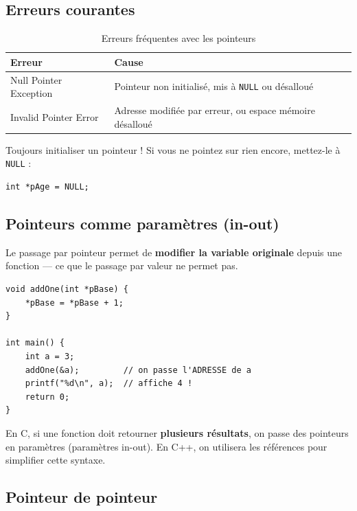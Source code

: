 \documentclass[12pt,a4paper]{article}
\begin{document}
\subsection{Erreurs courantes}

\begin{table}[h!]
\centering
\caption{Erreurs fréquentes avec les pointeurs}
\begin{tabular}{lp{8cm}}
\toprule
\textbf{Erreur} & \textbf{Cause} \\
\midrule
Null Pointer Exception & Pointeur non initialisé, mis à \texttt{NULL} ou désalloué \\
Invalid Pointer Error  & Adresse modifiée par erreur, ou espace mémoire désalloué \\
\bottomrule
\end{tabular}
\end{table}

\begin{important}
Toujours initialiser un pointeur ! Si vous ne pointez sur rien encore, mettez-le à \texttt{NULL} :
\begin{lstlisting}
int *pAge = NULL;
\end{lstlisting}
\end{important}

\subsection{Pointeurs comme paramètres (in-out)}

Le passage par pointeur permet de \textbf{modifier la variable originale} depuis une fonction — ce que le passage par valeur ne permet pas.

\begin{lstlisting}[caption={Passage par pointeur — modifie l'original}]
void addOne(int *pBase) {
    *pBase = *pBase + 1;
}

int main() {
    int a = 3;
    addOne(&a);         // on passe l'ADRESSE de a
    printf("%d\n", a);  // affiche 4 !
    return 0;
}
\end{lstlisting}

\begin{astuce}
En C, si une fonction doit retourner \textbf{plusieurs résultats}, on passe des pointeurs en paramètres (paramètres in-out). En C++, on utilisera les références pour simplifier cette syntaxe.
\end{astuce}

\subsection{Pointeur de pointeur}
\end{document}
